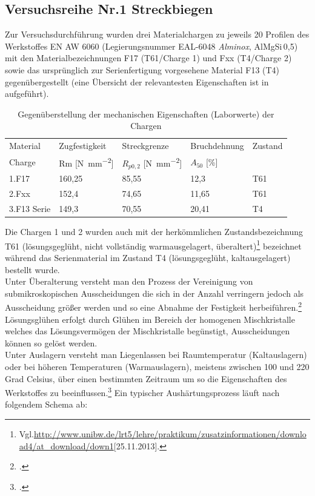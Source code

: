 \documentclass[12pt,a4paper,parskip]{scrartcl}
\begin{document}
\subsection{Versuchsreihe Nr.1 Streckbiegen}
\label{sec:versuchsreihe1}
Zur Versuchsdurchführung wurden drei Materialchargen zu jeweils 20 Profilen des Werkstoffes EN AW 6060 (Legierungsnummer EAL-6048 \emph{Alminox}, AlMgSi\,0,5) mit den Materialbezeichnungen F17 (T61/Charge 1) und Fxx (T4/Charge 2) sowie das ursprünglich zur Serienfertigung vorgesehene Material F13 (T4)  gegenübergestellt (eine Übersicht der relevantesten Eigenschaften ist in  aufgeführt).
\begin{table}[hbtp]
\caption{Gegenüberstellung der mechanischen Eigenschaften (Laborwerte) der Chargen}
\label{tab:chargeneigenschaften}
\centering
\begin{tabular}{lllll}
\toprule
Material & Zugfestigkeit & Streckgrenze & Bruchdehnung & Zustand \\
Charge &  Rm [\si{\newton\per\milli\meter\squared}] &  $R_{p0,2}$ [\si{\newton\per\milli\meter\squared}] &  $A_{50}$ [\%] & \\
\midrule
1.F17 & 160,25 & 85,55 &  12,3  & T61 \\
2.Fxx & 152,4 & 74,65 &   11,65  & T61 \\
3.F13 Serie & 149,3 & 70,55 & 20,41  & T4 \\
\bottomrule




\end{tabular}
\end{table}



 Die Chargen 1 und 2 wurden auch mit der herkömmlichen Zustandsbezeichnung T61 (lösungsgeglüht, nicht vollständig warmausgelagert, überaltert)\footnote{Vgl.\url{http://www.unibw.de/lrt5/lehre/praktikum/zusatzinformationen/download4/at_download/down1}[25.11.2013].} bezeichnet während das Serienmaterial im Zustand T4 (lösungsgeglüht, kaltausgelagert) bestellt wurde. \\
 Unter Überalterung versteht man  den Prozess der Vereinigung von  submikroskopischen Ausscheidungen die sich  in der Anzahl verringern jedoch als Ausscheidung größer werden und so eine Abnahme der Festigkeit herbeiführen.\footcite[Vgl.][52]{wki}\\
  Lösungsglühen erfolgt durch Glühen im Bereich der homogenen Mischkristalle welches das   Lösungsvermögen der Mischkristalle begünstigt, Ausscheidungen können so gelöst werden.\\
   Unter Auslagern versteht man Liegenlassen bei Raumtemperatur (Kaltauslagern) oder bei  höheren Temperaturen (Warmauslagern), meistens zwischen 100 und 220 Grad Celsius, über einen bestimmten Zeitraum um so die Eigenschaften des Werkstoffes zu beeinflussen.\footcite[Vgl.][213]{wk}
Ein typischer Aushärtungsprozess läuft nach folgendem Schema ab:
\end{document}
